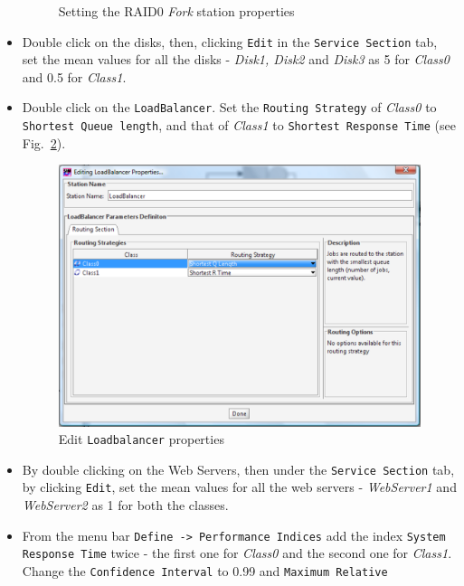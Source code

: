 \begin{itemize}
\begin{figure}[htb]
\begin{center}
    \end{center}
    \caption{Setting the RAID0 \emph{Fork} station properties}
    \label{fig:raid0prop}
\end{figure}

\item Double click on the disks, then, clicking \texttt{Edit} in
the \texttt{Service Section} tab, set the mean values for all the
disks - \emph{Disk1, Disk2} and \emph{Disk3} as 5 for
\emph{Class0} and 0.5 for \emph{Class1}.

\item Double click on the \texttt{LoadBalancer}. Set the
\texttt{Routing Strategy} of \emph{Class0} to \texttt{Shortest
Queue length}, and that of \emph{Class1} to \texttt{Shortest
Response Time} (see Fig.~\ref{fig:loadbalprop}).
\begin{figure}[htb]
    \begin{center}
        \includegraphics[scale=.5]{img/jsimg/12.22.eps}
    \end{center}
    \caption{Edit \texttt{Loadbalancer} properties}
    \label{fig:loadbalprop}
\end{figure}
\item By double clicking on the Web Servers, then under the
\texttt{Service Section} tab, by clicking \texttt{Edit}, set the
mean values for all the web servers - \emph{WebServer1} and
\emph{WebServer2} as 1 for both the classes. \item From the menu
bar \texttt{Define -> Performance Indices} add the index
\texttt{System Response Time} twice - the first one for
\emph{Class0} and the second one for \emph{Class1}. Change the
\texttt{Confidence Interval} to 0.99 and \texttt{Maximum Relative
}
\end{itemize}
